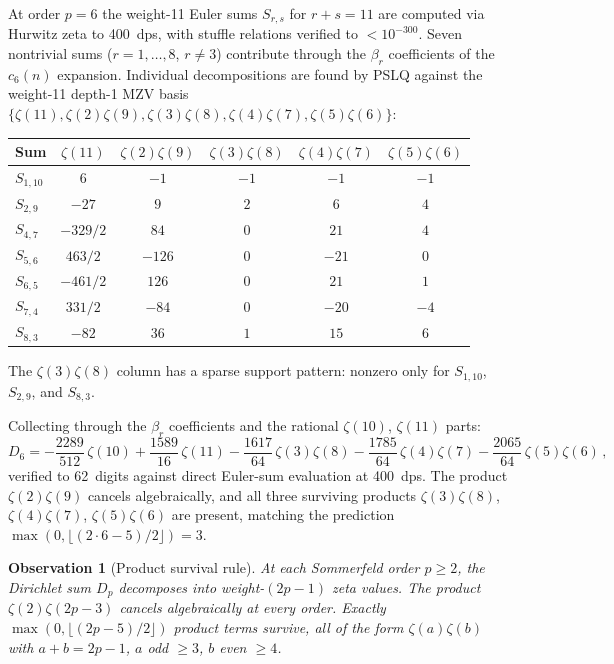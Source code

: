 \documentclass[11pt]{article}
\newtheorem{observation}{Observation}
\begin{document}
At order $p = 6$ the weight-11 Euler sums $S_{r,s}$ for $r + s = 11$
are computed via Hurwitz zeta to 400~dps, with stuffle relations
verified to $< 10^{-300}$.  Seven nontrivial sums ($r = 1, \ldots, 8$,
$r \ne 3$) contribute through the $\beta_r$ coefficients of the
$c_6(n)$ expansion.  Individual decompositions are found by PSLQ
against the weight-11 depth-1 MZV basis
$\{\zeta(11), \zeta(2)\zeta(9), \zeta(3)\zeta(8), \zeta(4)\zeta(7),
\zeta(5)\zeta(6)\}$:
\begin{center}
\begin{tabular}{lccccc}
\hline
Sum & $\zeta(11)$ & $\zeta(2)\zeta(9)$ & $\zeta(3)\zeta(8)$ & $\zeta(4)\zeta(7)$ & $\zeta(5)\zeta(6)$ \\
\hline
$S_{1,10}$ & $6$ & $-1$ & $-1$ & $-1$ & $-1$ \\
$S_{2,9}$ & $-27$ & $9$ & $2$ & $6$ & $4$ \\
$S_{4,7}$ & $-329/2$ & $84$ & $0$ & $21$ & $4$ \\
$S_{5,6}$ & $463/2$ & $-126$ & $0$ & $-21$ & $0$ \\
$S_{6,5}$ & $-461/2$ & $126$ & $0$ & $21$ & $1$ \\
$S_{7,4}$ & $331/2$ & $-84$ & $0$ & $-20$ & $-4$ \\
$S_{8,3}$ & $-82$ & $36$ & $1$ & $15$ & $6$ \\
\hline
\end{tabular}
\end{center}
The $\zeta(3)\zeta(8)$ column has a sparse support pattern: nonzero
only for $S_{1,10}$, $S_{2,9}$, and $S_{8,3}$.

Collecting through the $\beta_r$ coefficients and the rational
$\zeta(10)$, $\zeta(11)$ parts:
\begin{equation}
\label{eq:D6_decomp}
  D_6 = -\frac{2289}{512}\,\zeta(10)
  + \frac{1589}{16}\,\zeta(11)
  - \frac{1617}{64}\,\zeta(3)\zeta(8)
  - \frac{1785}{64}\,\zeta(4)\zeta(7)
  - \frac{2065}{64}\,\zeta(5)\zeta(6)\,,
\end{equation}
verified to 62~digits against direct Euler-sum evaluation at
400~dps.  The product $\zeta(2)\zeta(9)$ cancels algebraically,
and all three surviving products $\zeta(3)\zeta(8)$,
$\zeta(4)\zeta(7)$, $\zeta(5)\zeta(6)$ are present, matching the
prediction $\max(0, \lfloor(2 \cdot 6 - 5)/2\rfloor) = 3$.

\begin{observation}[Product survival rule]
\label{obs:product_rule}
At each Sommerfeld order $p \ge 2$, the Dirichlet sum $D_p$ decomposes
into weight-$(2p{-}1)$ zeta values.  The product $\zeta(2)\zeta(2p{-}3)$
cancels algebraically at every order.  Exactly
$\max(0, \lfloor(2p{-}5)/2\rfloor)$ product terms survive, all of the
form $\zeta(a)\zeta(b)$ with $a + b = 2p{-}1$, $a$ odd $\ge 3$,
$b$ even $\ge 4$.
\end{observation}
\end{document}
